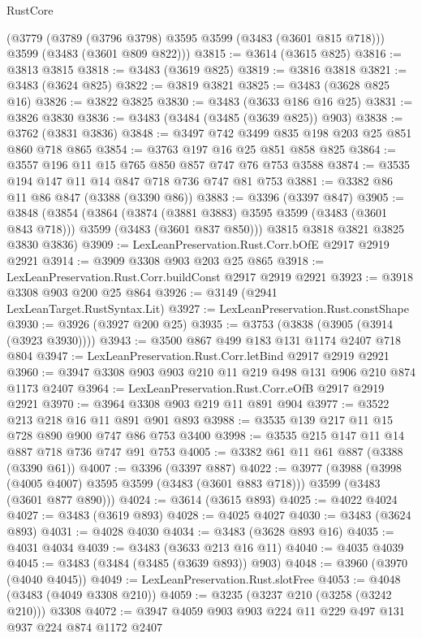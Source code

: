 \begin{lexlean}{RustCore}
\begin{coremodule}
    (@3779
      (@3789 (@3796 @3798) @3595 @3599 (@3483 (@3601 @815 @718)))
      @3599
      (@3483 (@3601 @809 @822)))
@3815 := @3614 (@3615 @825)
@3816 := @3813 @3815
@3818 := @3483 (@3619 @825)
@3819 := @3816 @3818
@3821 := @3483 (@3624 @825)
@3822 := @3819 @3821
@3825 := @3483 (@3628 @825 @16)
@3826 := @3822 @3825
@3830 := @3483 (@3633 @186 @16 @25)
@3831 := @3826 @3830
@3836 := @3483 (@3484 (@3485 (@3639 @825)) @903)
@3838 := @3762 (@3831 @3836)
@3848 := @3497 @742 @3499 @835 @198 @203 @25 @851 @860 @718 @865
@3854 := @3763 @197 @16 @25 @851 @858 @825
@3864 := @3557 @196 @11 @15 @765 @850 @857 @747 @76 @753 @3588
@3874 := @3535 @194 @147 @11 @14 @847 @718 @736 @747 @81 @753
@3881 := @3382 @86 @11 @86 @847 (@3388 (@3390 @86))
@3883 := @3396 (@3397 @847)
@3905 := @3848
    (@3854
      (@3864
        (@3874 (@3881 @3883) @3595 @3599 (@3483 (@3601 @843 @718)))
        @3599
        (@3483 (@3601 @837 @850)))
      @3815
      @3818
      @3821
      @3825
      @3830
      @3836)
@3909 := LexLeanPreservation.Rust.Corr.bOfE @2917 @2919 @2921
@3914 := @3909 @3308 @903 @203 @25 @865
@3918 := LexLeanPreservation.Rust.Corr.buildConst @2917 @2919 @2921
@3923 := @3918 @3308 @903 @200 @25 @864
@3926 := @3149 (@2941 LexLeanTarget.RustSyntax.Lit)
@3927 := LexLeanPreservation.Rust.constShape
@3930 := @3926 (@3927 @200 @25)
@3935 := @3753 (@3838 (@3905 (@3914 (@3923 @3930))))
@3943 := @3500 @867 @499 @183 @131 @1174 @2407 @718 @804
@3947 := LexLeanPreservation.Rust.Corr.letBind @2917 @2919 @2921
@3960 := @3947 @3308 @903 @903 @210 @11 @219 @498 @131 @906 @210 @874 @1173 @2407
@3964 := LexLeanPreservation.Rust.Corr.eOfB @2917 @2919 @2921
@3970 := @3964 @3308 @903 @219 @11 @891 @904
@3977 := @3522 @213 @218 @16 @11 @891 @901 @893
@3988 := @3535 @139 @217 @11 @15 @728 @890 @900 @747 @86 @753 @3400
@3998 := @3535 @215 @147 @11 @14 @887 @718 @736 @747 @91 @753
@4005 := @3382 @61 @11 @61 @887 (@3388 (@3390 @61))
@4007 := @3396 (@3397 @887)
@4022 := @3977
    (@3988
      (@3998 (@4005 @4007) @3595 @3599 (@3483 (@3601 @883 @718)))
      @3599
      (@3483 (@3601 @877 @890)))
@4024 := @3614 (@3615 @893)
@4025 := @4022 @4024
@4027 := @3483 (@3619 @893)
@4028 := @4025 @4027
@4030 := @3483 (@3624 @893)
@4031 := @4028 @4030
@4034 := @3483 (@3628 @893 @16)
@4035 := @4031 @4034
@4039 := @3483 (@3633 @213 @16 @11)
@4040 := @4035 @4039
@4045 := @3483 (@3484 (@3485 (@3639 @893)) @903)
@4048 := @3960 (@3970 (@4040 @4045))
@4049 := LexLeanPreservation.Rust.slotFree
@4053 := @4048 (@3483 (@4049 @3308 @210))
@4059 := @3235 (@3237 @210 (@3258 (@3242 @210))) @3308
@4072 := @3947 @4059 @903 @903 @224 @11 @229 @497 @131 @937 @224 @874 @1172 @2407

\end{coremodule}
\end{lexlean}
